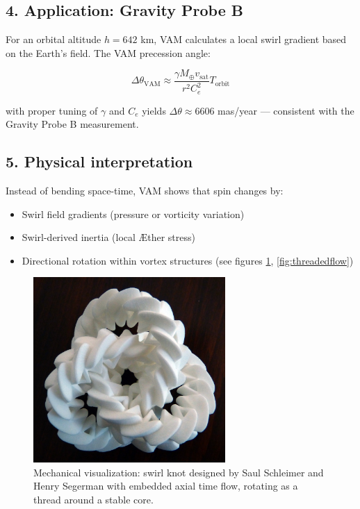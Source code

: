 \subsection*{4. Application: Gravity Probe B}
For an orbital altitude \( h = 642 \) km, VAM calculates a local swirl gradient based on the Earth's field. The VAM precession angle:

\[
\Delta\theta_\text{VAM} \approx \frac{\gamma M_{\oplus} v_\text{sat}}{r^2 C_e^2} T_\text{orbit}
\]

with proper tuning of \( \gamma \) and \( C_e \) yields \( \Delta\theta \approx 6606 \) mas/year — consistent with the Gravity Probe B measurement.

\subsection*{5. Physical interpretation}
Instead of bending space-time, VAM shows that spin changes by:
\begin{itemize}
\item Swirl field gradients (pressure or vorticity variation)
\item Swirl-derived inertia (local Æther stress)
\item Directional rotation within vortex structures (see figures \ref{fig:mechanicaltrefoil}, \ref{fig:threadedflow})
\end{itemize}

\begin{figure}[h!]
\centering
\includegraphics[width=0.65\textwidth]{mechanic_trefoil}
\caption{Mechanical visualization: swirl knot designed by Saul Schleimer and Henry Segerman
with embedded axial time flow, rotating as a thread around a stable core.}
\label{fig:mechanicaltrefoil}
\end{figure}

